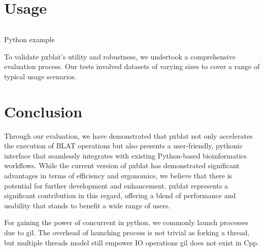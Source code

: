 \section*{Usage}\label{sec:usage}


\begin{listing}
	\inputminted[linenos]{python}{codes/example1.py}
	\caption{Python example}
	\label{listing:1}
\end{listing}


To validate \gls{pxblat}'s utility and robustness, we undertook a comprehensive evaluation process.
Our tests involved datasets of varying sizes to cover a range of typical usage scenarios.



\section*{Conclusion}\label{sec:conclusion}

Through our evaluation, we have demonstrated that \gls{pxblat} not only accelerates the execution of BLAT operations but also presents a user-friendly,
pythonic interface that seamlessly integrates with existing Python-based bioinformatics workflows.
While the current version of \gls{pxblat}  has demonstrated significant advantages in terms of efficiency and ergonomics, we believe that there is potential for further development and enhancement.
\gls{pxblat} represents a significant contribution in this regard, offering a blend of performance and usability that stands to benefit a wide range of users.

For gaining the power of concurrent in python, we commonly launch processes due to \gls{gil}.
The overhead of launching process is not trivial as forking a thread, but multiple threads model still empower IO operations
\gls{gil} does not exist in Cpp.


